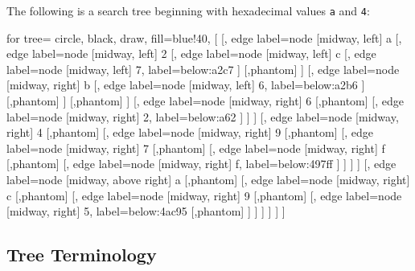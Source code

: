 \documentclass[10pt,letterpaper,leqno,bibliography=totoc]{scrartcl}
\newenvironment{alphafootnotes}
{\par\edef\savedfootnotenumber{\number\value{footnote}}
\renewcommand{\thefootnote}{\alph{footnote}}
\setcounter{footnote}{0}}
{\par\setcounter{footnote}{\savedfootnotenumber}}
\begin{document}
\begin{alphafootnotes}
\begin{multicols*}{2}
		The following is a search tree beginning with hexadecimal values \texttt{a} and \texttt{4}: \\
		
		
		\begin{forest}
		for tree={
			circle,
			black,
			draw,
			fill=blue!40,
		}
		[{}
		[{}, edge label={node [midway, left] {a}}
		[{}, edge label={node [midway, left] {2}}
		[{}, edge label={node [midway, left] {c}}
		[{}, edge label={node [midway, left] {7}}, label=below:a2c7
		]
		[,phantom]
		]
		[{}, edge label={node [midway, right] {b}}
		[{}, edge label={node [midway, left] {6}}, label=below:a2b6
		]
		[,phantom]
		]
		[,phantom]
		]
		[{}, edge label={node [midway, right] {6}}
		[,phantom]
		[{}, edge label={node [midway, right] {2}},	label=below:a62
		]
		]
		]
		[{}, edge label={node [midway, right] {4}}
		[,phantom]
		[{}, edge label={node [midway, right] {9}}
		[,phantom]
		[{}, edge label={node [midway, right] {7}}
		[,phantom]
		[{}, edge label={node [midway, right] {f}}
		[,phantom]
		[{}, edge label={node [midway, right] {f}}, label=below:497ff
		]
		]
		]
		]
		[{}, edge label={node [midway, above right] {a}}
		[,phantom]
		[{}, edge label={node [midway, right] {c}}
		[,phantom]
		[{}, edge label={node [midway, right] {9}}
		[,phantom]
		[{}, edge label={node [midway, right] {5}}, label=below:4ac95
		[,phantom]
		]
		]
		]
		]
		]
		]
		\end{forest}

	\subsection{Tree Terminology\supercite{wiki:xxx}}
	


\end{multicols*}
\end{alphafootnotes}
\end{document}
